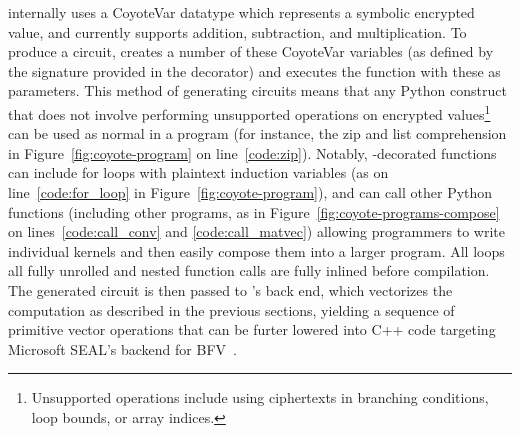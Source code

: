 \system internally uses a {\sf CoyoteVar} datatype which represents a symbolic encrypted value, and currently supports addition, subtraction, and multiplication.
To produce a circuit, \system creates a number of these {\sf CoyoteVar} variables (as defined by the signature provided in the decorator) and executes the function with these as parameters.
This method of generating circuits means that any Python construct that does not involve performing unsupported operations on encrypted values\footnote{Unsupported operations include using ciphertexts in branching conditions, loop bounds, or array indices.} can be used as normal in a \system program (for instance, the {\sf zip} and list comprehension in Figure~\ref{fig:coyote-program} on line~\ref{code:zip}).
Notably, \system-decorated functions can include for loops with plaintext induction variables (as on line~\ref{code:for_loop} in Figure~\ref{fig:coyote-program}), and can call other Python functions (including other \system programs, as in Figure~\ref{fig:coyote-programs-compose} on lines~\ref{code:call_conv} and \ref{code:call_matvec}) allowing programmers to write individual kernels and then easily compose them into a larger program.
All loops all fully unrolled and nested function calls are fully inlined before compilation.
The generated circuit is then passed to \system's back end, which vectorizes the computation as described in the previous sections, yielding a sequence of primitive vector operations that can be furter lowered into C++ code targeting Microsoft SEAL's backend for BFV~\cite{seal}.







